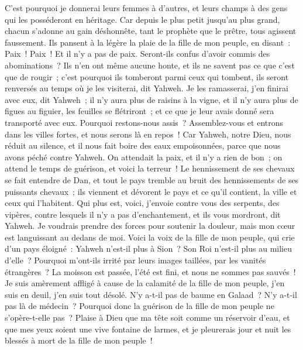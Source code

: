 \begin{multicols}{2}
C'est pourquoi je donnerai leurs femmes à d'autres, et leurs champs à des gens qui les posséderont en héritage. Car depuis le plus petit jusqu'au plus grand, chacun s'adonne au gain déshonnête, tant le prophète que le prêtre, tous agissent faussement.
Ils pansent à la légère la plaie de la fille de mon peuple, en disant~: Paix~! Paix~! Et il n'y a pas de paix.
Seront-ils confus d'avoir commis des abominations~? Ils n'en ont même aucune honte, et ils ne savent pas ce que c'est que de rougir~; c'est pourquoi ils tomberont parmi ceux qui tombent, ils seront renversés au temps où je les visiterai, dit Yahweh.
Je les ramasserai, j'en finirai avec eux, dit Yahweh~; il n'y aura plus de raisins à la vigne, et il n'y aura plus de figues au figuier, les feuilles se flétriront~; et ce que je leur avais donné sera transporté avec eux.
Pourquoi restons-nous assis~? Assemblez-vous et entrons dans les villes fortes, et nous serons là en repos~! Car Yahweh, notre Dieu, nous réduit au silence, et il nous fait boire des eaux empoisonnées, parce que nous avons péché contre Yahweh.
On attendait la paix, et il n'y a rien de bon~; on attend le temps de guérison, et voici la terreur~!
Le hennissement de ses chevaux se fait entendre de Dan, et tout le pays tremble au bruit des hennissements de ses puissants chevaux~; ils viennent et dévorent le pays et ce qu'il contient, la ville et ceux qui l'habitent.
Qui plus est, voici, j'envoie contre vous des serpents, des vipères, contre lesquels il n'y a pas d'enchantement, et ils vous mordront, dit Yahweh.
Je voudrais prendre des forces pour soutenir la douleur, mais mon cœur est languissant au dedans de moi.
Voici la voix de la fille de mon peuple, qui crie d'un pays éloigné~: Yahweh n'est-il plus à Sion~? Son Roi n'est-il plus au milieu d'elle~? Pourquoi m'ont-ils irrité par leurs images taillées, par les vanités étrangères~?
La moisson est passée, l'été est fini, et nous ne sommes pas sauvés~!
Je suis amèrement affligé à cause de la calamité de la fille de mon peuple, j'en suis en deuil, j'en suis tout désolé.
N'y a-t-il pas de baume en Galaad~? N'y a-t-il pas là de médecin~? Pourquoi donc la guérison de la fille de mon peuple ne s'opère-t-elle pas~?
\VerseOne{}Plaise à Dieu que ma tête soit comme un réservoir d'eau, et que mes yeux soient une vive fontaine de larmes, et je pleurerais jour et nuit les blessés à mort de la fille de mon peuple~!

\end{multicols}
